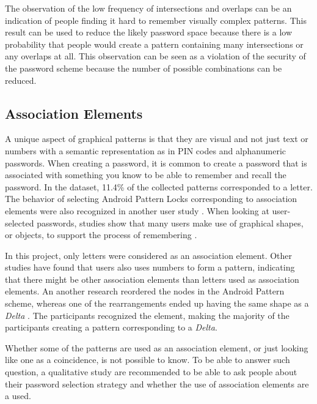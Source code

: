       The observation of the low frequency of intersections and overlaps can be an indication of people finding it hard to remember visually complex patterns. This result can be used to reduce the likely password space because there is a low probability that people would create a pattern containing many intersections or any overlaps at all. This observation can be seen as a violation of the security of the password scheme because the number of possible combinations can be reduced. 
    
    \subsection{Association Elements}
      A unique aspect of graphical patterns is that they are visual and not just text or numbers with a semantic representation as in PIN codes and alphanumeric passwords. When creating a password, it is common to create a password that is associated with something you know to be able to remember and recall the password. In the dataset, 11.4\% of the collected patterns corresponded to a letter. The behavior of selecting Android Pattern Locks corresponding to association elements were also recognized in another user study \cite{Sun}. When looking at user-selected passwords, studies show that many users make use of graphical shapes, or objects, to support the process of remembering \cite{Weiss}. 

      In this project, only letters were considered as an association element. Other studies have found that users also uses numbers to form a pattern, indicating that there might be other association elements than letters used as association elements. An another research reordered the nodes in the Android Pattern scheme, whereas one of the rearrangements ended up having the same shape as a {\it Delta} \cite{Uellenbeck}. The participants recognized the element, making the majority of the participants creating a pattern corresponding to a {\it Delta}. 

      Whether some of the patterns are used as an association element, or just looking like one as a coincidence, is not possible to know. To be able to answer such question, a qualitative study are recommended to be able to ask people about their password selection strategy and whether the use of association elements are a used. 

